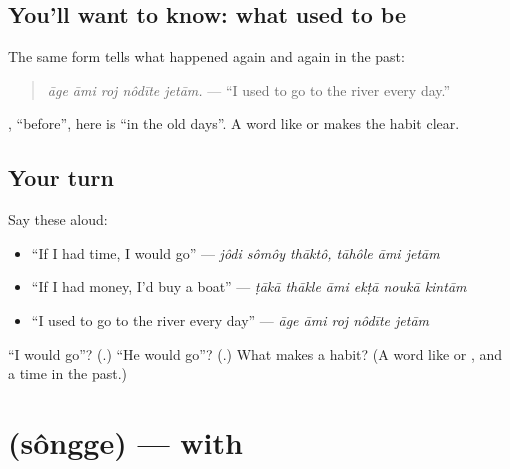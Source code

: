 \subsection*{You'll want to know: what used to be}
The same form tells what happened again and again in the past:

\begin{quote}
\textbf{    }
\end{quote}

\begin{quote}
\emph{āge āmi roj nôdīte jetām.} — \textquotedblleft{}I used to go to the river every day.\textquotedblright{}
\end{quote}

\textbf{}, \textquotedblleft{}before\textquotedblright{}, here is \textquotedblleft{}in the old days\textquotedblright{}. A word like \textbf{} or \textbf{} makes the habit clear.

\subsection*{Your turn}
Say these aloud:

\begin{itemize}
\raggedright
  \item \textquotedblleft{}If I had time, I would go\textquotedblright{} — \emph{jôdi sômôy thāktô, tāhôle āmi jetām}
  \item \textquotedblleft{}If I had money, I'd buy a boat\textquotedblright{} — \emph{ṭākā thākle āmi ekṭā noukā kintām}
  \item \textquotedblleft{}I used to go to the river every day\textquotedblright{} — \emph{āge āmi roj nôdīte jetām}
\end{itemize}

\begin{tcolorbox}[breakable,colback=teal!4,colframe=teal!35!black,title={Before you move on}]
\textquotedblleft{}I would go\textquotedblright{}? (\textbf{}.) \textquotedblleft{}He would go\textquotedblright{}? (\textbf{}.) What makes \textbf{} a habit? (A word like \textbf{} or \textbf{}, and a time in the past.)
\end{tcolorbox}
\section[\texorpdfstring{\bn{সঙ্গে} (sôngge)}{সঙ্গে (sôngge)}]{ (sôngge) — with}

